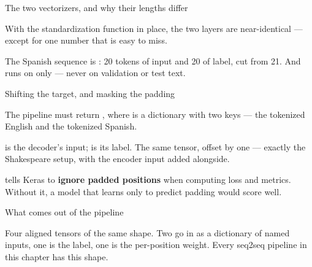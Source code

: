 \documentclass[aspectratio=169,11pt,t]{beamer}
\begin{document}
\begin{frame}[shrink=25]{The two vectorizers, and why their lengths differ}
{\fontsize{9.4}{12.6}\selectfont\color{fg2}With the standardization function in place, the two  layers are near-identical --- except for one number that is easy to miss.\par}\vskip 4pt
{\fontsize{9.4}{12.6}\selectfont\color{fg2}The Spanish sequence is : 20 tokens of input and 20 of label, cut from 21. And  runs on  only --- never on validation or test text.\par}\vskip 4pt
\end{frame}

\begin{frame}[shrink=25]{Shifting the target, and masking the padding}
{\fontsize{9.4}{12.6}\selectfont\color{fg2}The pipeline must return , where  is a dictionary with two keys --- the tokenized English and the tokenized Spanish.\par}\vskip 4pt
{\fontsize{9.4}{12.6}\selectfont\color{fg2} is the decoder's input;  is its label. The same tensor, offset by one --- exactly the Shakespeare setup, with the encoder input added alongside.\par}\vskip 4pt
\begin{iband}[signal]
 tells Keras to \textbf{ignore padded positions} when computing loss and metrics. Without it, a model that learns only to predict padding would score well.
\end{iband}
\end{frame}

\begin{frame}[shrink=25]{What comes out of the pipeline}
{\fontsize{9.4}{12.6}\selectfont\color{fg2}Four aligned tensors of the same shape. Two go in as a dictionary of named inputs, one is the label, one is the per-position weight. Every seq2seq pipeline in this chapter has this shape.\par}\vskip 4pt
\end{frame}
\end{document}
